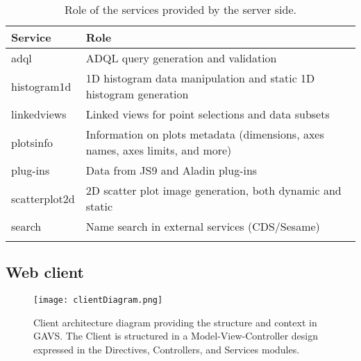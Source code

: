 \documentclass[longauth, final]{aa}
\begin{document}
\begin{table}[ht]
\caption{Role of the services provided by the server side.}
\label{tab:serv_service}
\begin{tabularx}{0.45\textwidth}{XX}
\\\hline
    \noalign{\smallskip}
Service & Role \\\hline\noalign{\smallskip}
adql & ADQL query generation and validation \\    \noalign{\smallskip}\hline    \noalign{\smallskip}

histogram1d & 1D histogram data manipulation and static 1D histogram generation \\    \noalign{\smallskip}\hline    \noalign{\smallskip}

linkedviews & Linked views for point selections and data subsets \\    \noalign{\smallskip}\hline    \noalign{\smallskip}

plotsinfo & Information on plots metadata (dimensions, axes names, axes limits, and more)
 \\    \noalign{\smallskip}\hline    \noalign{\smallskip}

plug-ins & Data from JS9 and Aladin plug-ins \\    \noalign{\smallskip}\hline    \noalign{\smallskip}

scatterplot2d & 2D scatter plot image generation, both dynamic and static \\    \noalign{\smallskip}\hline    \noalign{\smallskip}

search & Name search in external services (CDS/Sesame) \\    \noalign{\smallskip}\hline    \noalign{\smallskip}
\end{tabularx}
\end{table}



\subsection{Web client}

\begin{figure*}[!htbp]
\centering
    \texttt{[image: clientDiagram.png]}
  \caption{Client architecture diagram providing the structure and context in GAVS. The Client is structured in a Model-View-Controller
design expressed in the Directives, Controllers, and Services modules.}\label{fig:cli_diagram}
\end{figure*}
\end{document}
